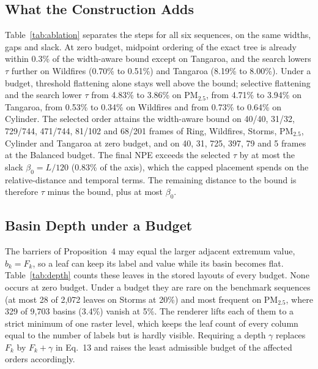 \documentclass[preprint]{vgtc}
\begin{document}
\subsection{What the Construction Adds}\label{sec:increments}

Table~\ref{tab:ablation} separates the steps for all six sequences, on the same widths, gaps and slack. At zero budget, midpoint ordering of the exact tree is already within 0.3\% of the width-aware bound except on Tangaroa, and the search lowers $\tau$ further on Wildfires (0.70\% to 0.51\%) and Tangaroa (8.19\% to 8.00\%). Under a budget, threshold flattening alone stays well above the bound; selective flattening and the search lower $\tau$ from 4.83\% to 3.86\% on PM$_{2.5}$, from 4.71\% to 3.94\% on Tangaroa, from 0.53\% to 0.34\% on Wildfires and from 0.73\% to 0.64\% on Cylinder. The selected order attains the width-aware bound on 40/40, 31/32, 729/744, 471/744, 81/102 and 68/201 frames of Ring, Wildfires, Storms, PM$_{2.5}$, Cylinder and Tangaroa at zero budget, and on 40, 31, 725, 397, 79 and 5 frames at the Balanced budget. The final NPE exceeds the selected $\tau$ by at most the slack $\beta_0=L/120$ (0.83\% of the axis), which the capped placement spends on the relative-distance and temporal terms. The remaining distance to the bound is therefore $\tau$ minus the bound, plus at most $\beta_0$.

\subsection{Basin Depth under a Budget}\label{sec:basin-depth}

The barriers of Proposition~4 may equal the larger adjacent extremum value, $b_k=F_k$, so a leaf can keep its label and value while its basin becomes flat. Table~\ref{tab:depth} counts these leaves in the stored layouts of every budget. None occurs at zero budget. Under a budget they are rare on the benchmark sequences (at most 28 of 2,072 leaves on Storms at 20\%) and most frequent on PM$_{2.5}$, where 329 of 9,703 basins (3.4\%) vanish at 5\%. The renderer lifts each of them to a strict minimum of one raster level, which keeps the leaf count of every column equal to the number of labels but is hardly visible. Requiring a depth $\gamma$ replaces $F_k$ by $F_k+\gamma$ in Eq.~13 and raises the least admissible budget of the affected orders accordingly.
\end{document}
